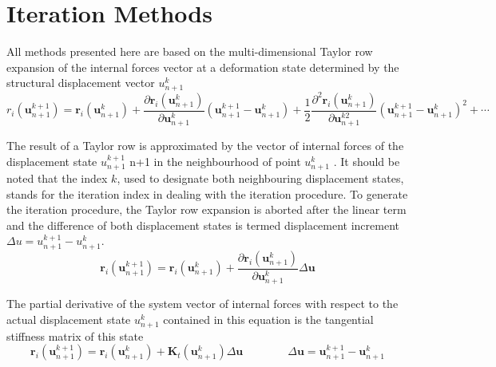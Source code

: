 \section{Iteration Methods}
\label{sec:7.2}
\label{chap:7.2}
All methods presented here are based on the multi-dimensional Taylor row expansion of the
internal forces vector at a deformation state determined by the structural displacement vector
$u ^k_{n+1}$
\begin{equation}
 r_{i}\left(\boldsymbol{u}_{n+1}^{k+1}\right)=\boldsymbol{r}_{i}\left(\boldsymbol{u}_{n+1}^{k}\right)+\frac{\partial \boldsymbol{r}_{i}\left(\boldsymbol{u}_{n+1}^{k}\right)}{\partial \boldsymbol{u}_{n+1}^{k}}\left(\boldsymbol{u}_{n+1}^{k+1}-\boldsymbol{u}_{n+1}^{k}\right)+\frac{1}{2} \frac{\partial^{2} \boldsymbol{r}_{i}\left(\boldsymbol{u}_{n+1}^{k}\right)}{\partial \boldsymbol{u}_{n+1}^{k 2}}\left(\boldsymbol{u}_{n+1}^{k+1}-\boldsymbol{u}_{n+1}^{k}\right)^{2}+\cdots 
 \label{eqn:7.3} 
\end{equation}

The result of a Taylor row is approximated by the vector of internal forces of the displacement
state $u^{k+1}_{n+1}$
n+1 in the neighbourhood of point $u^{k}_{n+1}$ . It should be noted that the index $k$, used to designate both neighbouring displacement states, stands for the iteration index in dealing with the
iteration procedure. To generate the iteration procedure, the Taylor row expansion is aborted
after the linear term and the difference of both displacement states is termed displacement increment $\Delta u = u^{k+1}_{n+1}-u^{k}_{n+1}$.
\begin{equation}
 \boldsymbol{r}_{i}\left(\boldsymbol{u}_{n+1}^{k+1}\right)=\boldsymbol{r}_{i}\left(\boldsymbol{u}_{n+1}^{k}\right)+\frac{\partial \boldsymbol{r}_{i}\left(\boldsymbol{u}_{n+1}^{k}\right)}{\partial \boldsymbol{u}_{n+1}^{k}} \Delta \boldsymbol{u} 
 \label{eqn:7.4} 
\end{equation}

The partial derivative of the system vector of internal forces with respect to the actual
displacement state $u^ k_{n+1}$ contained in this equation is the tangential stiffness matrix of this state
\begin{equation}
 \boldsymbol{r}_{i}\left(\boldsymbol{u}_{n+1}^{k+1}\right)=\boldsymbol{r}_{i}\left(\boldsymbol{u}_{n+1}^{k}\right)+\mathbf{K}_{t}\left(\boldsymbol{u}_{n+1}^{k}\right) \Delta \boldsymbol{u} \qquad \qquad \Delta \boldsymbol{u}=\boldsymbol{u}_{n+1}^{k+1}-\boldsymbol{u}_{n+1}^{k} 
\label{eqn:7.5} 
\end{equation}

